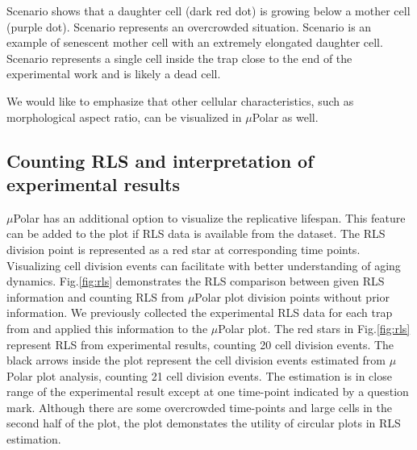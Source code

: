 \documentclass[conference]{IEEEtran}
\begin{document}
Scenario  shows that a daughter cell (dark red dot) is growing below a mother cell (purple dot). 
Scenario  represents an overcrowded situation. 
Scenario  is an example of senescent mother cell with an extremely elongated daughter cell. 
Scenario  represents a single cell inside the trap close to the end of the experimental work and is likely a dead cell. 


We would like to emphasize that other cellular characteristics, such as morphological aspect ratio, can be visualized in $\mu$Polar as well. 

\subsection{Counting RLS and interpretation of experimental results}
$\mu$Polar has an additional option to visualize the replicative lifespan. This feature can be added to the plot if RLS data is available from the dataset. The RLS division point is represented as a red star at corresponding time points.  
Visualizing cell division events can facilitate with better understanding of aging dynamics. Fig.\ref{fig:rls} demonstrates the RLS comparison between given RLS information and counting RLS from $\mu$Polar plot division points without prior information. We previously collected the experimental RLS data for each trap from \cite{r13} and applied this information to the $\mu$Polar plot. The  red stars in Fig.\ref{fig:rls} represent RLS from experimental results, counting 20 cell division events. The black arrows inside the plot represent the cell division events estimated from $\mu$Polar plot analysis, counting 21 cell division events. The estimation is in close range of the experimental result except at one time-point indicated by a question mark. Although there are some overcrowded time-points and large cells in the second half of the plot, the plot demonstates the utility of circular plots in RLS estimation. 
\end{document}
